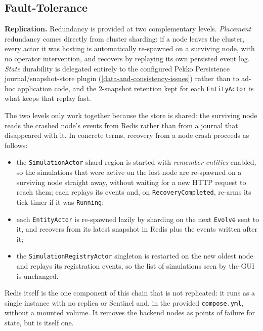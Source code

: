 \documentclass{scrreprt}
\begin{document}
\subsection{Fault-Tolerance}\label{fault-tolerance}

\textbf{Replication.} Redundancy is provided at two complementary levels. \emph{Placement}
redundancy comes directly from cluster sharding: if a node leaves the cluster, every actor it
was hosting is automatically re-spawned on a surviving node, with no operator intervention,
and recovers by replaying its own persisted event log. \emph{State} durability is delegated
entirely to the configured Pekko Persistence journal/snapshot-store plugin
(\cref{data-and-consistency-issues}) rather than to ad-hoc application code, and the
2-snapshot retention kept for each \texttt{EntityActor} is what keeps that replay fast.

The two levels only work together because the store is shared: the surviving node reads the
crashed node's events from Redis rather than from a journal that disappeared with it. In
concrete terms, recovery from a node crash proceeds as follows:
\begin{itemize}
  \item the \texttt{SimulationActor} shard region is started with \emph{remember entities}
  enabled, so the simulations that were active on the lost node are re-spawned on a surviving
  node straight away, without waiting for a new HTTP request to reach them; each replays its
  events and, on \texttt{RecoveryCompleted}, re-arms its tick timer if it was
  \texttt{Running};
  \item each \texttt{EntityActor} is re-spawned lazily by sharding on the next \texttt{Evolve}
  sent to it, and recovers from its latest snapshot in Redis plus the events written after it;
  \item the \texttt{SimulationRegistryActor} singleton is restarted on the new oldest node and
  replays its registration events, so the list of simulations seen by the GUI is unchanged.
\end{itemize}
Redis itself is the one component of this chain that is not replicated: it runs as a single
instance with no replica or Sentinel and, in the provided \texttt{compose.yml}, without a
mounted volume. It removes the backend nodes as points of failure for state, but is itself one.
\end{document}
